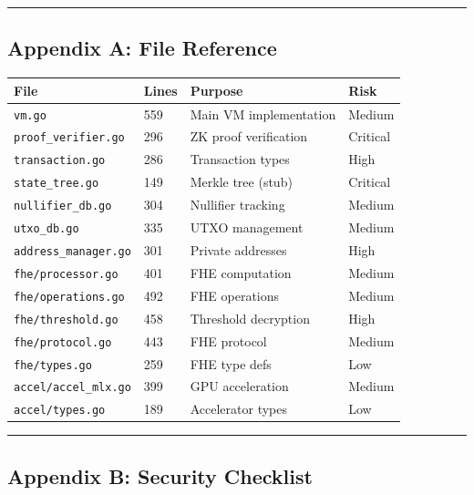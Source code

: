 \documentclass[
]{article}
\newcounter{none} %
\begin{document}
\begin{center}\rule{0.5\linewidth}{0.5pt}\end{center}

\subsection{Appendix A: File Reference}\label{appendix-a-file-reference}

{\def\LTcaptype{none} %
\begin{longtable}[]{@{}llll@{}}
\toprule\noalign{}
File & Lines & Purpose & Risk \\
\midrule\noalign{}
\endhead
\bottomrule\noalign{}
\endlastfoot
\texttt{vm.go} & 559 & Main VM implementation & Medium \\
\texttt{proof\_verifier.go} & 296 & ZK proof verification & Critical \\
\texttt{transaction.go} & 286 & Transaction types & High \\
\texttt{state\_tree.go} & 149 & Merkle tree (stub) & Critical \\
\texttt{nullifier\_db.go} & 304 & Nullifier tracking & Medium \\
\texttt{utxo\_db.go} & 335 & UTXO management & Medium \\
\texttt{address\_manager.go} & 301 & Private addresses & High \\
\texttt{fhe/processor.go} & 401 & FHE computation & Medium \\
\texttt{fhe/operations.go} & 492 & FHE operations & Medium \\
\texttt{fhe/threshold.go} & 458 & Threshold decryption & High \\
\texttt{fhe/protocol.go} & 443 & FHE protocol & Medium \\
\texttt{fhe/types.go} & 259 & FHE type defs & Low \\
\texttt{accel/accel\_mlx.go} & 399 & GPU acceleration & Medium \\
\texttt{accel/types.go} & 189 & Accelerator types & Low \\
\end{longtable}
}

\begin{center}\rule{0.5\linewidth}{0.5pt}\end{center}

\subsection{Appendix B: Security
Checklist}\label{appendix-b-security-checklist}
\end{document}
